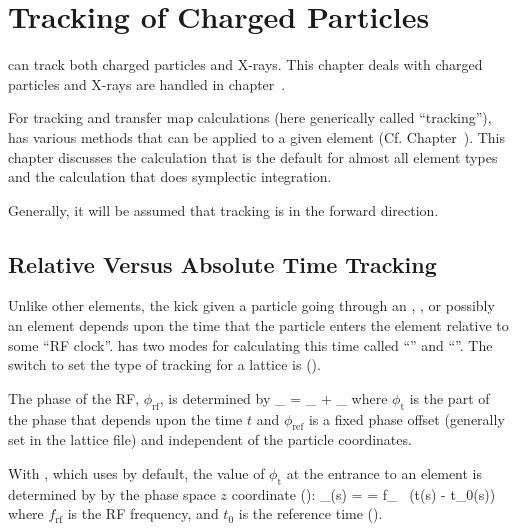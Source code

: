 \chapter{Tracking of Charged Particles}
\label{c:charged.track}

\bmad can track both charged particles and X-rays. This chapter deals
with charged particles and X-rays are handled in
chapter~.

For tracking and transfer map calculations (here generically called
``tracking''), \bmad has various methods that can be applied to a
given element (Cf. Chapter~). This chapter discusses
the  calculation that is the default for almost all
element types and the  calculation that does
symplectic integration.

Generally, it will be assumed that tracking is in the forward direction.

\section{Relative Versus Absolute Time Tracking}
\label{s:rf.time}

Unlike other elements, the kick given a particle going through an
, , or possibly an  element
depends upon the time that the particle enters the element relative to
some ``RF clock''. \bmad has two modes for calculating this time
called ``'' and ``''. The switch to set the type of tracking for a lattice is
 ().

The phase of the RF, $\phi_\text{rf}$, is determined by
\Begineq
  \phi_ = \phi_ + \phi_
\Endeq
where $\phi_\text{t}$ is the part of the phase that depends upon
the time $t$ and $\phi_\text{ref}$ is a fixed phase offset (generally set
in the lattice file) and independent of the particle coordinates.

With , which \bmad uses by default, the
value of $\phi_\text{t}$ at the entrance to an element is determined
by by the phase space $z$ coordinate ():
\Begineq
  \phi_(s) = 
  = f_ \, (t(s) - t_0(s))
\Endeq
where $f_\text{rf}$ is the RF frequency, and $t_0$ is the reference
time ().

